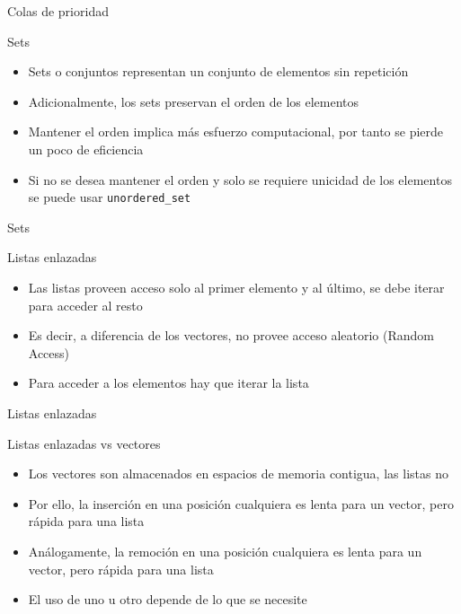 \documentclass[]{beamer}
\begin{document}
\begin{frame}{Colas de prioridad}
  
\end{frame}

\begin{frame}{Sets}
  \begin{itemize}
    \item Sets o conjuntos representan un conjunto de elementos sin repetici\'on
      \pause
    \item Adicionalmente, los sets preservan el orden de los elementos
      \pause
    \item Mantener el orden implica m\'as esfuerzo computacional, por tanto se pierde un poco de eficiencia
      \pause
    \item Si no se desea mantener el orden y solo se requiere unicidad de los elementos se puede usar \texttt{unordered\_set}
  \end{itemize}
\end{frame}

\begin{frame}{Sets}
  
\end{frame}

\begin{frame}{Listas enlazadas}
  \begin{itemize}
    \item Las listas proveen acceso solo al primer elemento y al \'ultimo, se debe iterar para acceder al resto
      \pause
    \item Es decir, a diferencia de los vectores, no provee acceso aleatorio (Random Access)
      \pause
    \item Para acceder a los elementos hay que iterar la lista
  \end{itemize}
\end{frame}

\begin{frame}{Listas enlazadas}
  
\end{frame}

\begin{frame}{Listas enlazadas vs vectores}
  \begin{itemize}
    \item Los vectores son almacenados en espacios de memoria contigua, las listas no
      \pause
    \item Por ello, la inserci\'on en una posici\'on cualquiera es lenta para un vector, pero r\'apida para una lista
      \pause
    \item An\'alogamente, la remoci\'on en una posici\'on cualquiera es lenta para un vector, pero r\'apida para una lista
      \pause
    \item El uso de uno u otro depende de lo que se necesite
  \end{itemize}
\end{frame}
\end{document}
